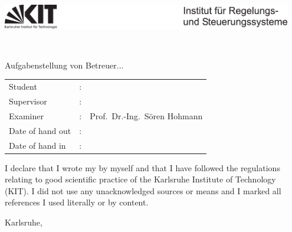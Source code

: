 \thispagestyle{empty}
\hspace{0.5cm}
\includegraphics[width=0.95\textwidth]{03_images/title_page/kitlogo_irs.pdf}

\vspace{1cm}

\centerline{\LARGE \textsf{\textbf{\artderarbeit{}\ \nummerderarbeit}}} %

\vspace{1cm}

\begin{center}
	\Huge \textsf{\textbf{\titelderarbeit}}
\end{center}

\vspace{1cm}
\sffamily
Aufgabenstellung von Betreuer...

\vspace{9cm} %


\begin{tabular}{lcl}
	Student &:& \student\addWithPreCommaSpace{\studentgrad} \\
	Supervisor &:& \betreuer\addWithPreCommaSpace{\betreuergrad} \\
	Examiner &:& Prof.\ Dr.-Ing.\ Sören Hohmann \\
	Date of hand out &:& \ausgabe \\
	Date of hand in &:& \abgabe
\end{tabular}

\vspace{0.25cm}

I declare that I wrote my \artderarbeit{} by myself and that I have followed the regulations relating to good scientific practice of the Karlsruhe Institute of Technology (KIT). I did not use any unacknowledged sources or means and I marked all references I used literally or by content.

\vspace{0.5cm}

Karlsruhe, \abgabe

\vspace{1.4cm}

\student\addWithPreCommaSpace{\studentgrad}
\rmfamily